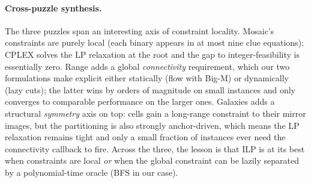 \paragraph{Cross-puzzle synthesis.} The three puzzles span an interesting axis of constraint locality. Mosaic's constraints are purely local (each binary appears in at most nine clue equations); CPLEX solves the LP relaxation at the root and the gap to integer-feasibility is essentially zero. Range adds a global \emph{connectivity} requirement, which our two formulations make explicit either statically (flow with Big-M) or dynamically (lazy cuts); the latter wins by orders of magnitude on small instances and only converges to comparable performance on the larger ones. Galaxies adds a structural \emph{symmetry} axis on top: cells gain a long-range constraint to their mirror images, but the partitioning is also strongly anchor-driven, which means the LP relaxation remains tight and only a small fraction of instances ever need the connectivity callback to fire. Across the three, the lesson is that ILP is at its best when constraints are local \emph{or} when the global constraint can be lazily separated by a polynomial-time oracle (BFS in our case).
